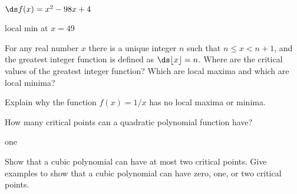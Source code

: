 \begin{enumialphparenastyle}
%

\begin{ex}
	$\ds f(x) = x^2 - 98x + 4$
	\begin{sol}
		local min at $x=49$
	\end{sol}
\end{ex}


\begin{ex}
	For any real number $x$ there is a unique
	integer $n$ such that $n \leq x < n +1$, and the greatest
	integer function is defined as $\ds\lfloor
	x\rfloor = n$. Where
	are the critical values of the greatest integer function?  Which are
	local maxima and which are local minima?
\end{ex}

\begin{ex}
	Explain why the function $f(x) =1/x$ has no local
	maxima or minima.
\end{ex}

\begin{ex}
	How many critical points can a quadratic polynomial function have?
	\begin{sol}
		one
	\end{sol}
\end{ex}

\begin{ex}
	Show that a cubic polynomial can have at most two critical
	points. Give examples to show that a cubic polynomial can have zero,
	one, or two critical points.
\end{ex}


\end{enumialphparenastyle}
